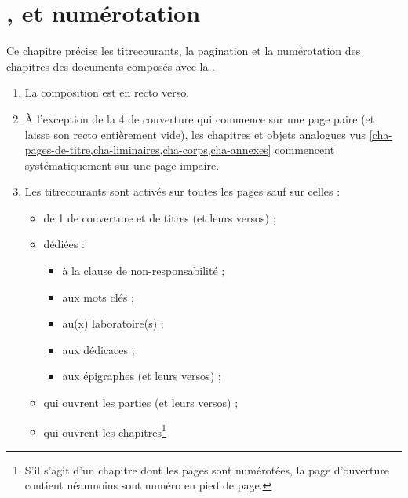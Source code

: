 \chapter{\texorpdfstring{}{Titres courants},  et numérotation}\label{cha-pagination}

Ce chapitre précise les \glspl{titrecourant}, la \gls{pagination} et la
numérotation des chapitres des documents composés avec la \yatCl{}.

\begin{enumerate}
\item La composition est en recto verso\exceptoneside.
\item À l'exception de la 4\ieme{} de couverture qui commence sur une page
  paire (et laisse son recto entièrement vide), les chapitres et objets
  analogues vus \vref{cha-pages-de-titre,cha-liminaires,cha-corps,cha-annexes}
  commencent systématiquement sur une page impaire\exceptoneside.
\item Les \glspl{titrecourant} sont activés sur toutes les pages sauf sur
  celles :
  \begin{itemize}
  \item de 1\iere{} de couverture et de titres (et leurs versos) ;
  \item dédiées :
    \begin{itemize}
    \item à la clause de non-responsabilité ;
    \item aux mots clés ;
    \item au(x) laboratoire(s) ;
    \item aux dédicaces ;
    \item aux épigraphes (et leurs versos) ;
    \end{itemize}
  \item qui ouvrent les parties (et leurs versos) ;
  \item qui ouvrent les chapitres\footnote{%
      S'il s'agit d'un chapitre dont les pages sont numérotées, la page
      d'ouverture contient néanmoins sont numéro en pied de page.%
}
\end{itemize}
\end{enumerate}
